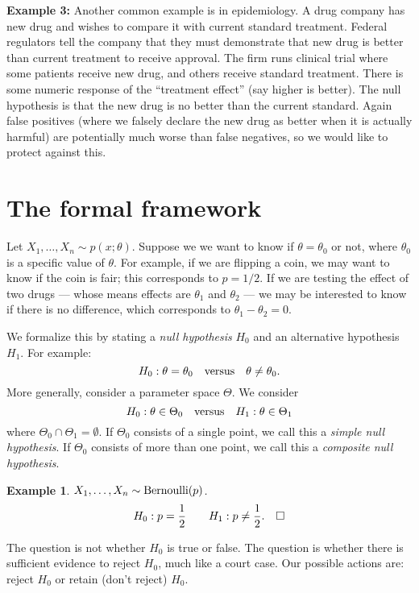 \documentclass[twoside,12pt]{article}
\newtheorem{example}[theorem]{Example}
\begin{document}
{\bf Example 3: } Another common example is in epidemiology. A drug company has new drug and wishes to compare it with current standard treatment. 
Federal regulators tell the company that they must demonstrate that new drug is better than current treatment to receive approval. The firm runs clinical trial where some patients receive new drug, and others receive standard treatment. There is some numeric response of the ``treatment effect'' (say higher is better). The null hypothesis is that the new drug is no better than the current standard. Again false positives (where we falsely declare the new drug as better when it is actually harmful) are potentially much worse than false negatives, so we would like to protect against this.

\section{The formal framework}

Let
$X_1,\ldots, X_n \sim p(x;\theta)$.
Suppose we we want to know if $\theta=\theta_0$ or not,
where $\theta_0$ is a specific value of $\theta$.
For example, if we are flipping a coin, we may want to know if the coin is fair;
this corresponds to $p=1/2$.
If we are testing the effect of two drugs ---
whose means effects are $\theta_1$ and $\theta_2$ ---
we may be interested to know if there is no difference,
which corresponds to $\theta_1 - \theta_2 = 0$.

We formalize this by stating a {\em null hypothesis} $H_0$
and an alternative hypothesis $H_1$.
For example:
$$
H_0: \theta = \theta_0 \ \ \ {\rm versus}\ \ \ \theta \neq \theta_0.
$$
More generally,
consider a parameter space $\Theta$.
We consider
$$
H_0: \theta \in \Theta_0\ \ \ {\rm versus}\ \ \ 
H_1: \theta \in \Theta_1
$$
where $\Theta_0 \cap \Theta_1 = \emptyset$.
If $\Theta_0$ consists of a single point, we call this a {\em simple null hypothesis}.
If $\Theta_0$ consists of more than one point, we call this a {\em composite null hypothesis}.


\begin{example}
$X_1,\ldots, X_n \sim {\rm Bernoulli}(p)$.
$$
H_0: p= \frac{1}{2}\ \ \ {\rm }\ \ \ H_1: p\neq \frac{1}{2}.\ \ \ \Box
$$
\end{example}


\vspace{1cm}


The question is not whether $H_0$ is true or false.
The question is whether there is sufficient evidence
to reject $H_0$, much like a court case.
Our possible actions are:
reject $H_0$ or retain (don't reject) $H_0$.
\end{document}

